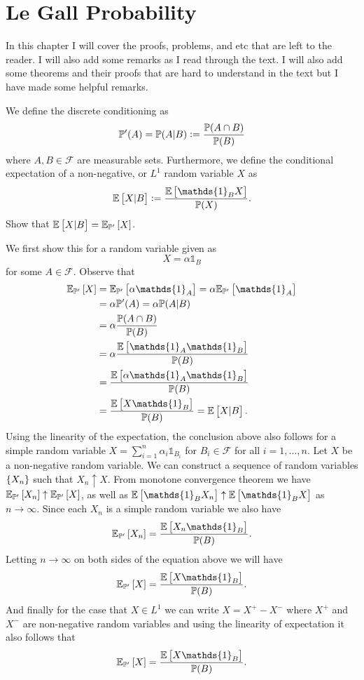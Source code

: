 \chapter{Le Gall Probability}

In this chapter I will cover the proofs, problems, and etc that are left to the reader. I will also add some remarks as I read through the text. I will also add some theorems and their proofs that are hard to understand in the text but I have made some helpful remarks.


\begin{problem}
	We define the discrete conditioning as
	\[ \mathbb{P}'(A) = \mathbb{P}(A|B) := \frac{\mathbb{P}(A\cap B)}{\mathbb{P}(B)} \]
	where $ A,B \in \mathcal{F} $ are measurable sets. Furthermore, we define the conditional expectation of a non-negative, or $ L^1 $ random variable $ X $ as
	\[ \E{X|B} := \frac{\E{\mathds{1}_B X}}{\prob(X)}. \]
	Show that $ \mathbb{E}\left[X|B\right] = \mathbb{E}_{\mathbb{P}'}\left[X\right] $.
\end{problem}
\begin{solution}
	We first show this for a random variable given as
	\[ X = \alpha\mathds{1}_{B} \]
	for some $ A \in \mathcal{F} $. Observe that
	\begin{align*}
		\mathbb{E}_{\prob'}\left[X\right] &= \mathbb{E}_{\prob'}\left[\alpha \mathds{1}_A \right] = \alpha \mathbb{E}_{\prob'}\left[\mathds{1}_A\right] \\
		&= \alpha \prob'(A) = \alpha \prob(A|B) \\
		&= \alpha\frac{\prob(A\cap B)}{\prob(B)} \\
		&= \alpha \frac{\E{\mathds{1}_A\mathds{1}_B}}{\prob(B)} \\
		&= \frac{\E{\alpha \mathds{1}_A \mathds{1}_B}}{\prob(B)} \\
		&= \frac{\E{X\mathds{1}_B}}{\prob(B)} = \E{X|B}.
	\end{align*} 
	Using the linearity of the expectation, the conclusion above also follows for a simple random variable $ X = \sum_{i=1}^{n} \alpha_i \mathds{1}_{B_i} $ for $ B_i \in \mathcal{F} $ for all $ i=1,\dots,n $. Let $ X $ be a non-negative random variable. We can construct a sequence of random variables $ \{X_n\} $ such that $ X_n \uparrow X $. From monotone convergence theorem we have $ \mathbb{E}_{\mathbb{P}'}\left[X_n \right] \uparrow \mathbb{E}_{\mathbb{P}'}\left[X \right] $, as well as $ \E{\mathds{1}_B X_n} \uparrow \E{\mathds{1}_B X} $ as $ n\to\infty $. Since each $ X_n $ is a simple random variable we also have
	\[ \mathbb{E}_{\prob'}\left[X_n \right] = \frac{\E{X_n\mathds{1}_B}}{\prob(B)}. \]
	Letting $ n\to\infty $ on both sides of the equation above we will have
	\[ \mathbb{E}_{\prob'}\left[X \right] = \frac{\E{X\mathds{1}_B}}{\prob(B)}. \]
	And finally for the case that $ X \in L^1 $ we can write $ X = X^+ - X^- $ where $ X^+ $ and $ X^- $ are non-negative random variables and using the linearity of expectation it also follows that 
	\[ \mathbb{E}_{\prob'}\left[X \right] = \frac{\E{X\mathds{1}_B}}{\prob(B)}. \]
\end{solution}

